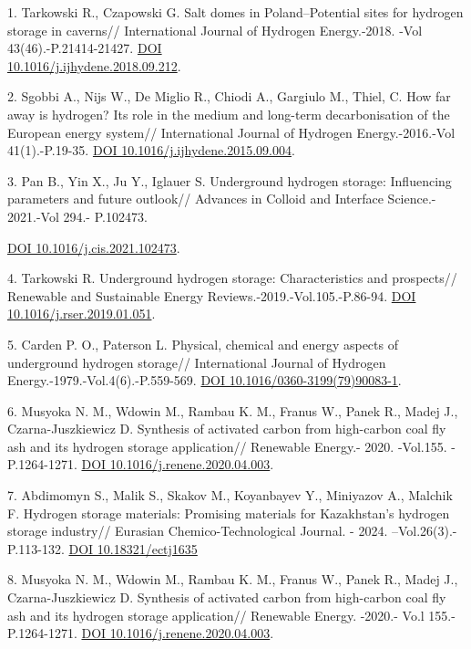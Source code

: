 \begin{refs}
1. Tarkowski R., Czapowski G. Salt domes in Poland--Potential sites for
hydrogen storage in caverns// International Journal of Hydrogen
Energy.-2018. -Vol 43(46).-P.21414-21427.
\href{https://doi.org/10.1016/j.ijhydene.2018.09.212}{DOI\\
10.1016/j.ijhydene.2018.09.212}.

2. Sgobbi A., Nijs W., De Miglio R., Chiodi A., Gargiulo M., Thiel, C.
How far away is hydrogen? Its role in the medium and long-term
decarbonisation of the European energy system// International Journal of
Hydrogen Energy.-2016.-Vol 41(1).-P.19-35.
\href{https://doi.org/10.1016/j.ijhydene.2015.09.004}{DOI
10.1016/j.ijhydene.2015.09.004}.

3. Pan B., Yin X., Ju Y., Iglauer S. Underground hydrogen storage:
Influencing parameters and future outlook// Advances in Colloid and
Interface Science.- 2021.-Vol 294.- P.102473.

\href{https://doi.org/10.1016/j.cis.2021.102473}{DOI
10.1016/j.cis.2021.102473}.

4. Tarkowski R. Underground hydrogen storage: Characteristics and
prospects// Renewable and Sustain\-able Energy
Reviews.-2019.-Vol.105.-P.86-94.
\href{https://doi.org/10.1016/j.rser.2019.01.051}{DOI
10.1016/j.rser.2019.01.051}.

5. Carden P. O., Paterson L. Physical, chemical and energy aspects of
underground hydrogen storage// International Journal of Hydrogen
Energy.-1979.-Vol.4(6).-P.559-569.
\href{https://doi.org/10.1016/0360-3199(79)90083-1}{DOI
10.1016/0360-3199(79)90083-1}.

6. Musyoka N. M., Wdowin M., Rambau K. M., Franus W., Panek R., Madej
J., Czarna-Juszkiewicz D. Synthesis of activated carbon from high-carbon
coal fly ash and its hydrogen storage application// Renewable Energy.-
2020. -Vol.155. -P.1264-1271.
\href{https://doi.org/10.1016/j.renene.2020.04.003}{DOI
10.1016/j.renene.2020.04.003}.

7. Abdimomyn S., Malik S., Skakov M., Koyanbayev Y., Miniyazov A.,
Malchik F. Hydrogen storage materials: Promising materials for
Kazakhstan's hydrogen storage industry// Eurasian Chemico-Techno\-logical
Journal. - 2024. --Vol.26(3).- P.113-132.
\href{https://doi.org/10.18321/ectj1635}{DOI 10.18321/ectj1635}

8. Musyoka N. M., Wdowin M., Rambau K. M., Franus W., Panek R., Madej
J., Czarna-Juszkiewicz D. Synthesis of activated carbon from high-carbon
coal fly ash and its hydrogen storage application// Renewable Energy.
-2020.- Vo.l 155.- P.1264-1271.
\href{https://doi.org/10.1016/j.renene.2020.04.003}{DOI
10.1016/j.renene.2020.04.003}.


\end{refs}
